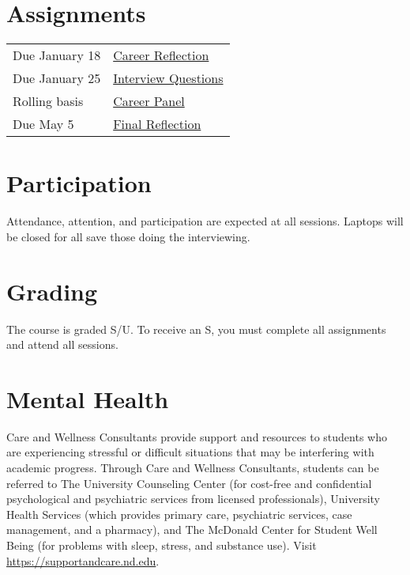 \documentclass[11pt]{article}
\begin{document}
\section{Assignments}
\label{sec:orgde49807}
\begin{center}
\begin{tabular}{ll}
Due January 18 & \href{https://forms.gle/395K9j9xREVQg88NA}{Career Reflection}\\
Due January 25 & \href{https://forms.gle/fRgPeqDvfJ78tRaY9}{Interview Questions}\\
Rolling basis & \href{https://drive.google.com/drive/folders/1r\_wSSi8Jvphhkkfh8ujKThlI-RCvBMRM?usp=share\_link}{Career Panel}\\
Due May 5 & \href{https://forms.gle/RKgMz2pRvyeByRZb9}{Final Reflection}\\
\end{tabular}
\end{center}

\section{Participation}
\label{sec:org1d3c1a2}
Attendance, attention, and participation are expected at all sessions. Laptops will be closed for all save those doing the interviewing.

\section{Grading}
\label{sec:orged2ebd7}
The course is graded S/U. To receive an S, you must complete all assignments and attend all sessions.

\section{Mental Health}
\label{sec:org2517ad4}
Care and Wellness Consultants provide support and resources to students who are experiencing stressful or difficult situations that may be interfering with academic progress. Through Care and Wellness Consultants, students can be referred to The University Counseling
Center (for cost-free and confidential psychological and psychiatric services from
licensed professionals), University Health Services (which provides primary care,
psychiatric services, case management, and a pharmacy), and The McDonald
Center for Student Well Being (for problems with sleep, stress, and substance
use). Visit \url{https://supportandcare.nd.edu}.
\end{document}
